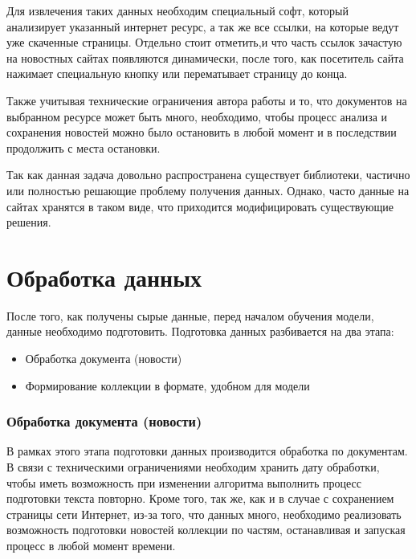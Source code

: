 Для извлечения таких данных необходим специальный софт, который анализирует указанный интернет ресурс, а так же все ссылки, на которые ведут уже скаченные страницы. Отдельно стоит отметить,и что часть ссылок зачастую на новостных сайтах появляются динамически, после того, как посетитель сайта нажимает специальную кнопку или перематывает страницу до конца.

Также учитывая технические ограничения автора работы и то, что документов на выбранном ресурсе может быть много, необходимо, чтобы процесс анализа и сохранения новостей можно было остановить в любой момент и в последствии продолжить с места остановки.

Так как данная задача довольно распространена существует библиотеки, частично или полностью решающие проблему получения данных. Однако, часто данные на сайтах хранятся в таком виде, что приходится модифицировать существующие решения. 

%
\section{Обработка данных}

После того, как получены сырые данные, перед началом обучения модели, данные необходимо подготовить. Подготовка данных разбивается на два этапа:

\begin{itemize}
    \item Обработка документа (новости)
    \item Формирование коллекции в формате, удобном для модели
\end{itemize}

%
\subsubsection{Обработка документа (новости)}

В рамках этого этапа подготовки данных производится обработка по документам. В связи с техническими ограничениями необходим хранить дату обработки, чтобы иметь возможность при изменении алгоритма выполнить процесс подготовки текста повторно. Кроме того, так же, как и в случае с сохранением страницы сети Интернет, из-за того, что данных много, необходимо реализовать возможность подготовки новостей коллекции по частям, останавливая и запуская процесс в любой момент времени.

